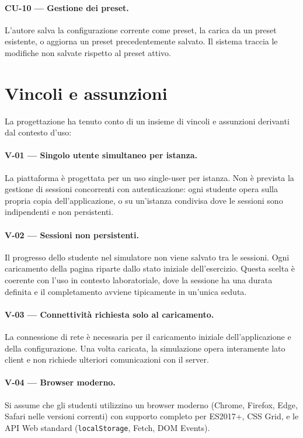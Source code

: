 \paragraph{CU-10 --- Gestione dei preset.} L'autore salva la configurazione corrente come preset, la carica da un preset esistente, o aggiorna un preset precedentemente salvato. Il sistema traccia le modifiche non salvate rispetto al preset attivo.


\section{Vincoli e assunzioni}
\label{sec:vincoli-assunzioni}

La progettazione ha tenuto conto di un insieme di vincoli e assunzioni derivanti dal contesto d'uso:

\paragraph{V-01 --- Singolo utente simultaneo per istanza.} La piattaforma è progettata per un uso single-user per istanza. Non è prevista la gestione di sessioni concorrenti con autenticazione: ogni studente opera sulla propria copia dell'applicazione, o su un'istanza condivisa dove le sessioni sono indipendenti e non persistenti.

\paragraph{V-02 --- Sessioni non persistenti.} Il progresso dello studente nel simulatore non viene salvato tra le sessioni. Ogni caricamento della pagina riparte dallo stato iniziale dell'esercizio. Questa scelta è coerente con l'uso in contesto laboratoriale, dove la sessione ha una durata definita e il completamento avviene tipicamente in un'unica seduta.

\paragraph{V-03 --- Connettività richiesta solo al caricamento.} La connessione di rete è necessaria per il caricamento iniziale dell'applicazione e della configurazione. Una volta caricata, la simulazione opera interamente lato client e non richiede ulteriori comunicazioni con il server.

\paragraph{V-04 --- Browser moderno.} Si assume che gli studenti utilizzino un browser moderno (Chrome, Firefox, Edge, Safari nelle versioni correnti) con supporto completo per ES2017+, CSS Grid, e le API Web standard (\texttt{localStorage}, Fetch, DOM Events).

